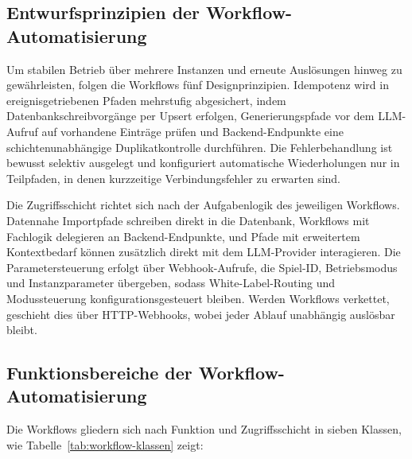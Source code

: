 \subsection{Entwurfsprinzipien der Workflow-Automatisierung}\label{n8n-designprinzipien}

Um stabilen Betrieb über mehrere Instanzen und erneute Auslösungen hinweg zu gewährleisten, folgen die Workflows fünf Designprinzipien. Idempotenz wird in ereignisgetriebenen Pfaden mehrstufig abgesichert, indem Datenbankschreibvorgänge per Upsert erfolgen, Generierungspfade vor dem LLM-Aufruf auf vorhandene Einträge prüfen und Backend-Endpunkte eine schichtenunabhängige Duplikatkontrolle durchführen. Die Fehlerbehandlung ist bewusst selektiv ausgelegt und konfiguriert automatische Wiederholungen nur in Teilpfaden, in denen kurzzeitige Verbindungsfehler zu erwarten sind.

Die Zugriffsschicht richtet sich nach der Aufgabenlogik des jeweiligen Workflows. Datennahe Importpfade schreiben direkt in die Datenbank, Workflows mit Fachlogik delegieren an Backend-Endpunkte, und Pfade mit erweitertem Kontextbedarf können zusätzlich direkt mit dem LLM-Provider interagieren. Die Parametersteuerung erfolgt über Webhook-Aufrufe, die Spiel-ID, Betriebsmodus und Instanzparameter übergeben, sodass White-Label-Routing und Modussteuerung konfigurationsgesteuert bleiben. Werden Workflows verkettet, geschieht dies über HTTP-Webhooks, wobei jeder Ablauf unabhängig auslösbar bleibt.

\newpage
\subsection{Funktionsbereiche der Workflow-Automatisierung}\label{workflow-klassen}

Die Workflows gliedern sich nach Funktion und Zugriffsschicht in sieben Klassen, wie Tabelle~\ref{tab:workflow-klassen} zeigt:


